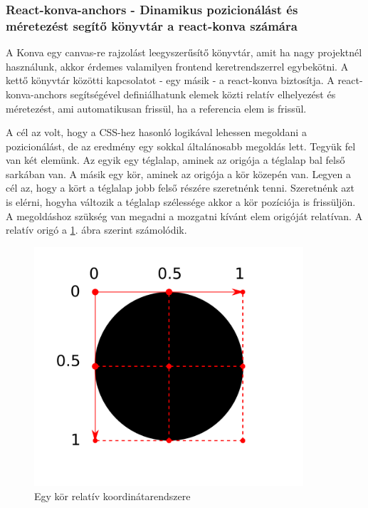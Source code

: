 \documentclass[a4paper,12pt,oneside]{report}
\begin{document}
\subsubsection{React-konva-anchors - Dinamikus pozicionálást és méretezést segítő könyvtár a react-konva számára}

\begin{justify}

	A Konva egy canvas-re rajzolást leegyszerűsítő könyvtár, amit ha nagy projektnél használunk, akkor érdemes valamilyen frontend keretrendszerrel egybekötni. A kettő könyvtár közötti kapcsolatot - egy másik - a react-konva biztosítja. A react-konva-anchors segítségével definiálhatunk elemek közti relatív elhelyezést és méretezést, ami automatikusan frissül, ha a referencia elem is frissül. 

	A cél az volt, hogy a CSS-hez hasonló logikával lehessen megoldani a pozicionálást, de az eredmény egy sokkal általánosabb megoldás lett. Tegyük fel van két elemünk. Az egyik egy téglalap, aminek az origója a téglalap bal felső sarkában van. A másik egy kör, aminek az origója a kör közepén van. Legyen a cél az, hogy a kört a téglalap jobb felső részére szeretnénk tenni. Szeretnénk azt is elérni, hogyha változik a téglalap szélessége akkor a kör pozíciója is frissüljön. A megoldáshoz szükség van megadni a mozgatni kívánt elem origóját relatívan. A relatív origó a \ref{fig:position_anchor}. ábra szerint számolódik.

    \begin{figure}[h]
        \centering
		\includegraphics[width=10cm]{contents/images/position_anchor.png}
		\caption{ Egy kör relatív koordinátarendszere}
		\label{fig:position_anchor}
	\end{figure}


\end{justify}
\end{document}

